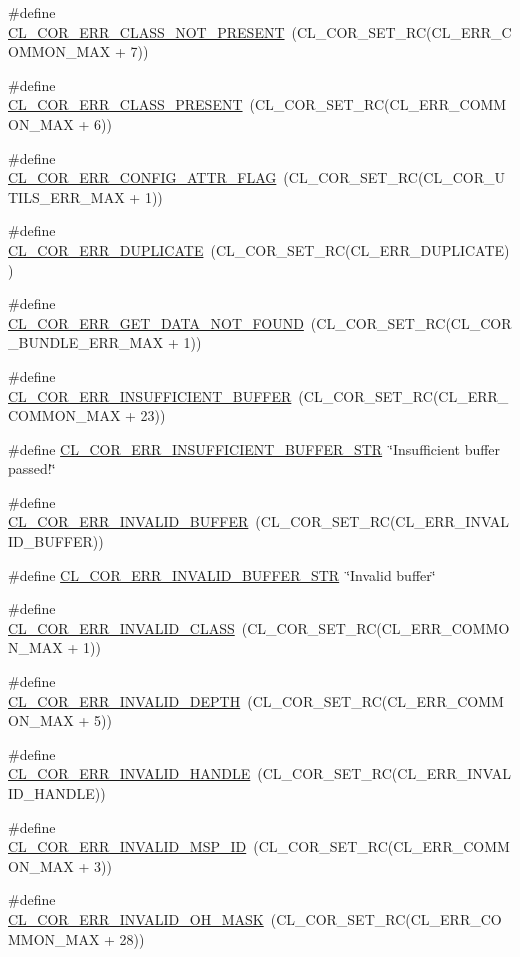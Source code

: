 \begin{CompactItemize}
\#define \hyperlink{group__group13_ga162}{CL\_\-COR\_\-ERR\_\-CLASS\_\-NOT\_\-PRESENT}~(CL\_\-COR\_\-SET\_\-RC(CL\_\-ERR\_\-COMMON\_\-MAX + 7))
\item 
\#define \hyperlink{group__group13_ga161}{CL\_\-COR\_\-ERR\_\-CLASS\_\-PRESENT}~(CL\_\-COR\_\-SET\_\-RC(CL\_\-ERR\_\-COMMON\_\-MAX + 6))
\item 
\#define \hyperlink{group__group13_ga241}{CL\_\-COR\_\-ERR\_\-CONFIG\_\-ATTR\_\-FLAG}~(CL\_\-COR\_\-SET\_\-RC(CL\_\-COR\_\-UTILS\_\-ERR\_\-MAX + 1))
\item 
\#define \hyperlink{group__group13_ga153}{CL\_\-COR\_\-ERR\_\-DUPLICATE}~(CL\_\-COR\_\-SET\_\-RC(CL\_\-ERR\_\-DUPLICATE))
\item 
\#define \hyperlink{group__group13_ga247}{CL\_\-COR\_\-ERR\_\-GET\_\-DATA\_\-NOT\_\-FOUND}~(CL\_\-COR\_\-SET\_\-RC(CL\_\-COR\_\-BUNDLE\_\-ERR\_\-MAX + 1))
\item 
\#define \hyperlink{group__group13_ga178}{CL\_\-COR\_\-ERR\_\-INSUFFICIENT\_\-BUFFER}~(CL\_\-COR\_\-SET\_\-RC(CL\_\-ERR\_\-COMMON\_\-MAX + 23))
\item 
\#define \hyperlink{group__group13_ga266}{CL\_\-COR\_\-ERR\_\-INSUFFICIENT\_\-BUFFER\_\-STR}~\char`\"{}Insufficient buffer passed!\char`\"{}
\item 
\#define \hyperlink{group__group13_ga151}{CL\_\-COR\_\-ERR\_\-INVALID\_\-BUFFER}~(CL\_\-COR\_\-SET\_\-RC(CL\_\-ERR\_\-INVALID\_\-BUFFER))
\item 
\#define \hyperlink{group__group13_ga267}{CL\_\-COR\_\-ERR\_\-INVALID\_\-BUFFER\_\-STR}~\char`\"{}Invalid buffer\char`\"{}
\item 
\#define \hyperlink{group__group13_ga156}{CL\_\-COR\_\-ERR\_\-INVALID\_\-CLASS}~(CL\_\-COR\_\-SET\_\-RC(CL\_\-ERR\_\-COMMON\_\-MAX + 1))
\item 
\#define \hyperlink{group__group13_ga160}{CL\_\-COR\_\-ERR\_\-INVALID\_\-DEPTH}~(CL\_\-COR\_\-SET\_\-RC(CL\_\-ERR\_\-COMMON\_\-MAX + 5))
\item 
\#define \hyperlink{group__group13_ga150}{CL\_\-COR\_\-ERR\_\-INVALID\_\-HANDLE}~(CL\_\-COR\_\-SET\_\-RC(CL\_\-ERR\_\-INVALID\_\-HANDLE))
\item 
\#define \hyperlink{group__group13_ga158}{CL\_\-COR\_\-ERR\_\-INVALID\_\-MSP\_\-ID}~(CL\_\-COR\_\-SET\_\-RC(CL\_\-ERR\_\-COMMON\_\-MAX + 3))
\item 
\#define \hyperlink{group__group13_ga183}{CL\_\-COR\_\-ERR\_\-INVALID\_\-OH\_\-MASK}~(CL\_\-COR\_\-SET\_\-RC(CL\_\-ERR\_\-COMMON\_\-MAX + 28))
\item 

\end{CompactItemize}
